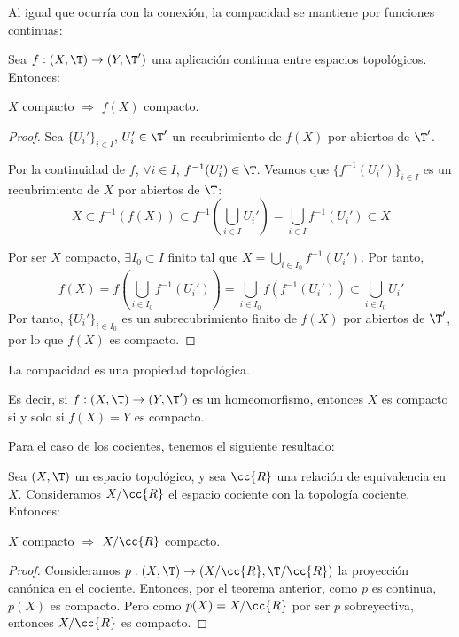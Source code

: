 Al igual que ocurría con la conexión, la compacidad se mantiene por funciones continuas:
\begin{samepage}
\begin{prop}
    Sea $f:(X,\T)\to (Y,\T')$ una aplicación continua entre espacios topológicos. Entonces:
    \begin{center}
        $X$ compacto $\Longrightarrow$ $f(X)$ compacto.
    \end{center}
\end{prop}
\end{samepage}
\begin{proof}
    Sea $\{U_i'\}_{i\in I}$, $U_i'\in \T'$ un recubrimiento de $f(X)$ por abiertos de $\T'$.

    Por la continuidad de $f$, $\forall i\in I$, $f^{-1}(U_i')\in \T$. Veamos que $\{f^{-1}(U_i')\}_{i\in I}$ es un recubrimiento de $X$ por abiertos de $\T$:
    \begin{equation*}
        X \subset f^{-1}(f(X)) \subset f^{-1}\left(\bigcup_{i\in I}U_i'\right) = \bigcup_{i\in I}f^{-1}(U_i') \subset X
    \end{equation*}

    Por ser $X$ compacto, $\exists I_0\subset I$ finito tal que $X=\bigcup\limits_{i\in I_0}f^{-1}(U_i')$. Por tanto,
    \begin{equation*}
        f(X) = f\left(\bigcup_{i\in I_0}f^{-1}(U_i')\right) = \bigcup_{i\in I_0}f(f^{-1}(U_i')) \subset \bigcup_{i\in I_0}U_i'
    \end{equation*}
    Por tanto, $\{U_i'\}_{i\in I_0}$ es un subrecubrimiento finito de $f(X)$ por abiertos de $\T'$, por lo que $f(X)$ es compacto.
\end{proof}
\begin{coro}
    La compacidad es una propiedad topológica.

    Es decir, si $f:(X,\T)\to (Y,\T')$ es un homeomorfismo, entonces $X$ es compacto si y solo si $f(X)=Y$ es compacto.
\end{coro}

Para el caso de los cocientes, tenemos el siguiente resultado:
\begin{prop}
    Sea $(X,\T)$ un espacio topológico, y sea $\cc{R}$ una relación de equivalencia en $X$. Consideramos $X/\cc{R}$ el espacio cociente con la topología cociente.
    Entonces:
    \begin{center}
        $X$ compacto $\Longrightarrow$ $X/\cc{R}$ compacto.
    \end{center}
\end{prop}
\begin{proof}
    Consideramos $p:(X,\T)\to (X/\cc{R}, \T/\cc{R})$ la proyección canónica en el cociente.
    Entonces, por el teorema anterior, como $p$ es continua, $p(X)$ es compacto. Pero como $p(X)=X/\cc{R}$ por ser $p$ sobreyectiva, entonces $X/\cc{R}$ es compacto.
\end{proof}

